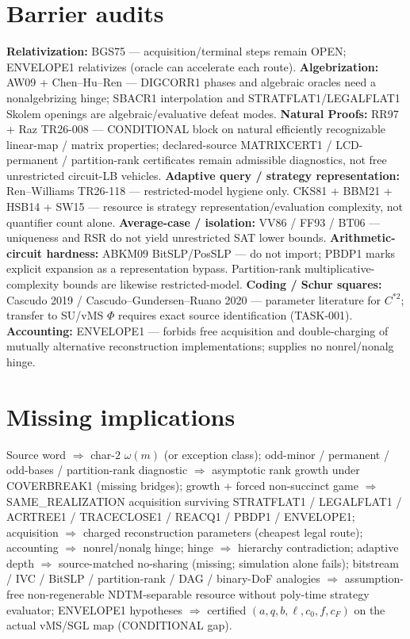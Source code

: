 \documentclass[11pt]{article}
\begin{document}
\section*{Barrier audits}
\textbf{Relativization:} BGS75 --- acquisition/terminal steps remain OPEN; ENVELOPE1 relativizes
(oracle can accelerate each route).
\textbf{Algebrization:} AW09 + Chen--Hu--Ren --- DIGCORR1 phases and algebraic oracles need a
nonalgebrizing hinge; SBACR1 interpolation and STRATFLAT1/LEGALFLAT1 Skolem openings are
algebraic/evaluative defeat modes.
\textbf{Natural Proofs:} RR97 + Raz TR26-008 --- CONDITIONAL block on natural efficiently
recognizable linear-map / matrix properties; declared-source MATRIXCERT1 / LCD-permanent /
partition-rank certificates remain admissible diagnostics, not free unrestricted circuit-LB
vehicles.
\textbf{Adaptive query / strategy representation:} Ren--Williams TR26-118 --- restricted-model
hygiene only. CKS81 + BBM21 + HSB14 + SW15 --- resource is strategy representation/evaluation
complexity, not quantifier count alone.
\textbf{Average-case / isolation:} VV86 / FF93 / BT06 --- uniqueness and RSR do not yield
unrestricted SAT lower bounds.
\textbf{Arithmetic-circuit hardness:} ABKM09 BitSLP/PosSLP --- do not import; PBDP1 marks
explicit expansion as a representation bypass. Partition-rank multiplicative-complexity bounds
are likewise restricted-model.
\textbf{Coding / Schur squares:} Cascudo 2019 / Cascudo--Gundersen--Ruano 2020 --- parameter
literature for $C^{*2}$; transfer to SU/vMS $\Phi$ requires exact source identification
(TASK-001).
\textbf{Accounting:} ENVELOPE1 --- forbids free acquisition and double-charging of mutually
alternative reconstruction implementations; supplies no nonrel/nonalg hinge.

\section*{Missing implications}
Source word $\Rightarrow$ char-$2$ $\omega(m)$ (or exception class);
odd-minor / permanent / odd-bases / partition-rank diagnostic $\Rightarrow$ asymptotic rank growth
under COVERBREAK1 (missing bridges);
growth + forced non-succinct game $\Rightarrow$ SAME\_REALIZATION acquisition surviving
STRATFLAT1 / LEGALFLAT1 / ACRTREE1 / TRACECLOSE1 / REACQ1 / PBDP1 / ENVELOPE1;
acquisition $\Rightarrow$ charged reconstruction parameters (cheapest legal route);
accounting $\Rightarrow$ nonrel/nonalg hinge;
hinge $\Rightarrow$ hierarchy contradiction;
adaptive depth $\Rightarrow$ source-matched no-sharing (missing; simulation alone fails);
bitstream / IVC / BitSLP / partition-rank / DAG / binary-DoF analogies $\Rightarrow$ assumption-free
non-regenerable NDTM-separable resource without poly-time strategy evaluator;
ENVELOPE1 hypotheses $\Rightarrow$ certified $(a,q,b,\ell,c_0,f,c_F)$ on the actual vMS/SGL map
(CONDITIONAL gap).
\end{document}
